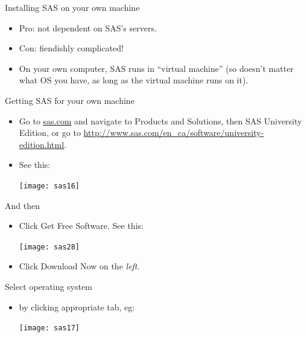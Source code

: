 \documentclass[unknownkeysallowed]{beamer}\usepackage[]{graphicx}\usepackage[]{color}
\begin{document}
\begin{frame}[fragile]{Installing SAS on your own machine}

  \begin{itemize}
  \item Pro: not dependent on SAS's servers.
  \item Con: fiendishly complicated!
  \item On your own computer, SAS runs in ``virtual machine'' (so
    doesn't matter what OS you have, as long as the virtual machine
    runs on it).
  \end{itemize}
  
\end{frame}


\begin{frame}[fragile]{Getting SAS for your own machine}
  
  \begin{itemize}
  \item Go to \url{sas.com} and navigate to Products and Solutions,
    then SAS University Edition, or
    go to \url{http://www.sas.com/en_ca/software/university-edition.html}.
  \item See this:
    
    \texttt{[image: sas16]}
  \end{itemize}
  
\end{frame}

\begin{frame}[fragile]{And then}
  
  \begin{itemize}
  \item Click Get Free Software. See this:
    
    \texttt{[image: sas28]}
    
  \item Click Download Now on the \emph{left}.
  \end{itemize}
  
\end{frame}

\begin{frame}[fragile]{Select operating system}
  
  \begin{itemize}
  \item by clicking appropriate tab, eg:
    
    \texttt{[image: sas17]}
  \end{itemize}
  
\end{frame}
\end{document}
